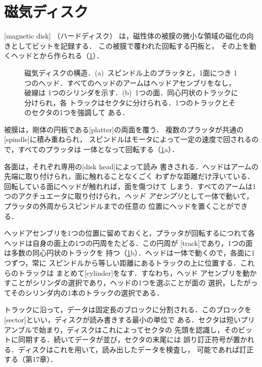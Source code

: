 \documentclass[../main.tex]{subfiles}
\begin{document}
\section{磁気ディスク}
\label{sec:l16-disk}

[magnetic disk]%
（ハードディスク）
は，磁性体の被膜の微小な領域の磁化の向きとしてビットを記録する．
この被膜で覆われた回転する円板と，
その上を動くヘッドとから作られる（\cref{fig:l16-disk}）．

\begin{figure}[htbp]
  \centering
  
  \caption{磁気ディスクの構造．(a)~スピンドル上のプラッタと，1面につき
    1つのヘッド．すべてのヘッドのアームはヘッドアセンブリをなし，破線は
    1つのシリンダを示す．(b)~1つの面．同心円状のトラックに分けられ，各
    トラックはセクタに分けられる．1つのトラックとそのセクタの1つを強調して
    ある．}
  \label{fig:l16-disk}
\end{figure}

被膜は，剛体の円板である[platter]の両面を覆う．
複数のプラッタが共通の[spindle]に積み重ねられ，
スピンドルはモータによって一定の速度で回されるので，すべてのプラッタは
一体となって回転する（\cref{fig:l16-disk}a）．

各面は，それぞれ専用の[disk head]によって読み
書きされる．ヘッドはアームの先端に取り付けられ，面に触れることなくごく
わずかな距離だけ浮いている．回転している面にヘッドが触れれば，面を傷つけて
しまう．すべてのアームは1つのアクチュエータに取り付けられ，\emph{ヘッド
アセンブリ}として一体で動いて，プラッタの外周からスピンドルまでの任意の
位置にヘッドを置くことができる．

ヘッドアセンブリを1つの位置に留めておくと，プラッタが回転するにつれて各
ヘッドは自身の面上の1つの円周をたどる．この円周が
[track]であり，1つの面は多数の同心円状のトラックを
持つ（\cref{fig:l16-disk}b）．ヘッドは一体で動くので，各面に1つずつ，常に
スピンドルから等しい距離にあるトラックの上に位置する．これらのトラックは
まとめて[cylinder]をなす．すなわち，ヘッド
アセンブリを動かすことがシリンダの選択であり，ヘッドの1つを選ぶことが面の
選択，したがってそのシリンダ内の1本のトラックの選択である．

トラックに沿って，データは固定長のブロックに分割される．このブロックを
[sector]といい，ディスクが読み書きする最小の単位で
ある．セクタは短いプリアンブルで始まり，ディスクはこれによってセクタの
先頭を認識し，そのビットに同期する．続いてデータが並び，セクタの末尾には
誤り訂正符号が置かれる．ディスクはこれを用いて，読み出したデータを検査し，
可能であれば訂正する（第17章）．
\end{document}
